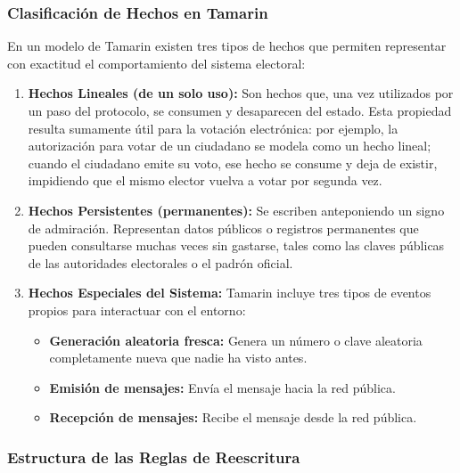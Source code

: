 \subsubsection{Clasificación de Hechos en Tamarin}

En un modelo de Tamarin existen tres tipos de hechos que permiten representar con exactitud el comportamiento del sistema electoral:

\begin{enumerate}
	\item \textbf{Hechos Lineales (de un solo uso):} Son hechos que, una vez utilizados por un paso del protocolo, se consumen y desaparecen del estado. Esta propiedad resulta sumamente útil para la votación electrónica: por ejemplo, la autorización para votar de un ciudadano se modela como un hecho lineal; cuando el ciudadano emite su voto, ese hecho se consume y deja de existir, impidiendo que el mismo elector vuelva a votar por segunda vez.

	\item \textbf{Hechos Persistentes (permanentes):} Se escriben anteponiendo un signo de admiración. Representan datos públicos o registros permanentes que pueden consultarse muchas veces sin gastarse, tales como las claves públicas de las autoridades electorales o el padrón oficial.

	\item \textbf{Hechos Especiales del Sistema:} Tamarin incluye tres tipos de eventos propios para interactuar con el entorno:
	\begin{itemize}
		\item \textbf{Generación aleatoria fresca:} Genera un número o clave aleatoria completamente nueva que nadie ha visto antes.
		\item \textbf{Emisión de mensajes:} Envía el mensaje hacia la red pública.
		\item \textbf{Recepción de mensajes:} Recibe el mensaje desde la red pública.
	\end{itemize}
\end{enumerate}

\subsubsection{Estructura de las Reglas de Reescritura}

